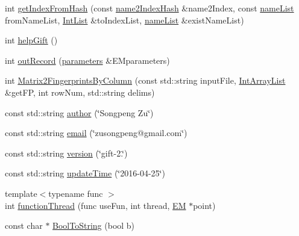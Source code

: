 \begin{DoxyCompactItemize}
\item 
int \hyperlink{namespacegift_a835110af070bdfb37d092c6a7f79d65c}{get\+Index\+From\+Hash} (const \hyperlink{namespacegift_a88a96011620ed18b8321bc36a816773c}{name2\+Index\+Hash} \&name2\+Index, const \hyperlink{namespacegift_a62f85efaab3bff48335863ae0670c7a7}{name\+List} from\+Name\+List, \hyperlink{namespacegift_a786390fe70b2e3b6d61dba1014651f03}{Int\+List} \&to\+Index\+List, \hyperlink{namespacegift_a62f85efaab3bff48335863ae0670c7a7}{name\+List} \&exist\+Name\+List)
\item 
int \hyperlink{namespacegift_abe7a96fe61b2734ca7a9e17ba2f887ae}{help\+Gift} ()
\item 
int \hyperlink{namespacegift_ac979b293ba5cbc8e11abe5cb82c2aede}{out\+Record} (\hyperlink{classgift_1_1parameters}{parameters} \&E\+Mparameters)
\item 
int \hyperlink{namespacegift_ab77c5b0e239f05c8453cc623b856692f}{Matrix2\+Fingerprints\+By\+Column} (const std\+::string input\+File, \hyperlink{namespacegift_a98b589c33d80e413fceaf8afd8e25815}{Int\+Array\+List} \&get\+FP, int row\+Num, std\+::string delims)
\item 
const std\+::string \hyperlink{namespacegift_a808b6e0e19d275854aa787f2eac4df98}{author} (\char`\"{}Songpeng Zu\char`\"{})
\item 
const std\+::string \hyperlink{namespacegift_aa24ca2be91b60d3c50d6848e87233a4c}{email} (\char`\"{}zusongpeng@gmail.\+com\char`\"{})
\item 
const std\+::string \hyperlink{namespacegift_a5a720324a7e112ad94437108be453df3}{version} (\char`\"{}gift-\/2.\char`\"{})
\item 
const std\+::string \hyperlink{namespacegift_a55b20ab87c86ecd24ad1432649c32df9}{update\+Time} (\char`\"{}2016-\/04-\/25\char`\"{})
\item 
{\footnotesize template$<$typename func $>$ }\\int \hyperlink{namespacegift_a0ba808abf8dcd67f2ca7cdff2a9fb91c}{function\+Thread} (func use\+Fun, int thread, \hyperlink{classgift_1_1_e_m}{EM} $\ast$point)
\item 
const char $\ast$ \hyperlink{namespacegift_a2dcec74ec4b5ef21616982a060e13f5e}{Bool\+To\+String} (bool b)
\end{DoxyCompactItemize}
